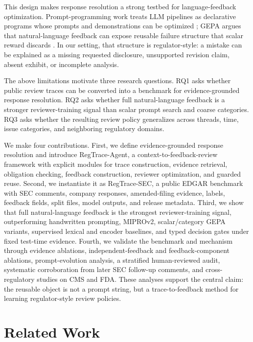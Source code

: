 \documentclass[11pt]{article}
\newcommand{\task}{evidence-grounded response resolution}
\newcommand{\dataset}{RegTrace-SEC}
\newcommand{\framework}{RegTrace-Agent}
\begin{document}
This design makes response resolution a strong testbed for language-feedback optimization. Prompt-programming work treats LLM pipelines as declarative programs whose prompts and demonstrations can be optimized \citep{khattab2023dspy}; GEPA argues that natural-language feedback can expose reusable failure structure that scalar reward discards \citep{agrawal2026gepa}. In our setting, that structure is regulator-style: a mistake can be explained as a missing requested disclosure, unsupported revision claim, absent exhibit, or incomplete analysis.

The above limitations motivate three research questions. RQ1 asks whether public review traces can be converted into a benchmark for evidence-grounded response resolution. RQ2 asks whether full natural-language feedback is a stronger reviewer-training signal than scalar prompt search and coarse categories. RQ3 asks whether the resulting review policy generalizes across threads, time, issue categories, and neighboring regulatory domains.

We make four contributions. First, we define \task{} and introduce \framework{}, a context-to-feedback-review framework with explicit modules for trace construction, evidence retrieval, obligation checking, feedback construction, reviewer optimization, and guarded reuse. Second, we instantiate it as \dataset{}, a public EDGAR benchmark with SEC comments, company responses, amended-filing evidence, labels, feedback fields, split files, model outputs, and release metadata. Third, we show that full natural-language feedback is the strongest reviewer-training signal, outperforming handwritten prompting, MIPROv2, scalar/category GEPA variants, supervised lexical and encoder baselines, and typed decision gates under fixed test-time evidence. Fourth, we validate the benchmark and mechanism through evidence ablations, independent-feedback and feedback-component ablations, prompt-evolution analysis, a stratified human-reviewed audit, systematic corroboration from later SEC follow-up comments, and cross-regulatory studies on CMS and FDA. These analyses support the central claim: the reusable object is not a prompt string, but a trace-to-feedback method for learning regulator-style review policies.

\section{Related Work}
\end{document}

